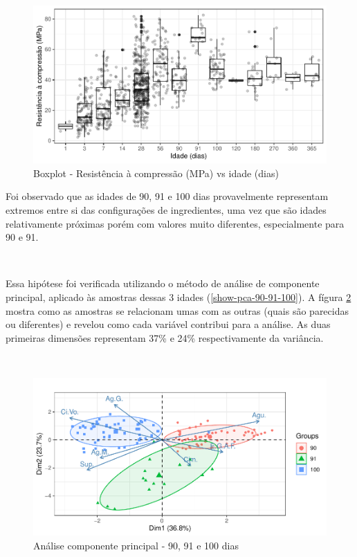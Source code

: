 \documentclass[]{article}
\begin{document}
\begin{figure}

{\centering \includegraphics{paper_PT_files/figure-latex/boxplot-1} 

}

\caption{Boxplot - Resistência à compressão (MPa) vs idade (dias)}\label{fig:boxplot}
\end{figure}

Foi observado que as idades de 90, 91 e 100 dias provavelmente
representam extremos entre si das configurações de ingredientes, uma vez
que são idades relativamente próximas porém com valores muito
diferentes, especialmente para 90 e 91.

~

Essa hipótese foi verificada utilizando o método de análise de
componente principal, aplicado às amostras dessas 3 idades
(\ref{show-pca-90-91-100}). A fígura \ref{fig:pca-90-91-100} mostra como
as amostras se relacionam umas com as outras (quais são parecidas ou
diferentes) e revelou como cada variável contribui para a análise. As
duas primeiras dimensões representam 37\% e 24\% respectivamente da
variância.

~

\begin{figure}

{\centering \includegraphics{paper_PT_files/figure-latex/pca-90-91-100-1} 

}

\caption{Análise componente principal - 90, 91 e 100 dias}\label{fig:pca-90-91-100}
\end{figure}
\end{document}
